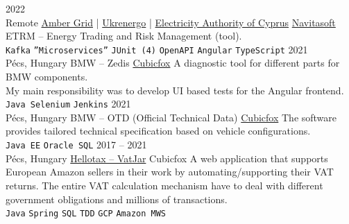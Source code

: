 \documentclass[9pt]{developercv} %
\begin{document}


\begin{entrylist}
    \entry
        {2022 \\ Remote}
        {\href{https://www.ambergrid.lt/en/}{Amber Grid} | \href{https://en.wikipedia.org/wiki/Ukrenergo}{Ukrenergo} | \href{https://en.wikipedia.org/wiki/Electricity_Authority_of_Cyprus}{Electricity Authority of Cyprus}}
        {\href{https://navitasoft.com/en}{Navitasoft}}
        {ETRM -- Energy Trading and Risk Management (tool). \\
            \texttt{Kafka}\slashsep
            \texttt{''Microservices''}\slashsep
            \texttt{JUnit (4)}\slashsep
            \texttt{OpenAPI}\slashsep
            \texttt{Angular}\slashsep
            \texttt{TypeScript}
        }
    \entry
        {2021 \\ Pécs, Hungary}
        {BMW -- Zedis}
        {\href{https://cubicfox.com/}{Cubicfox}}
        {A diagnostic tool for different parts for BMW components.\\
            My main responsibility was to develop UI based tests for the Angular frontend.\\
            \texttt{Java Selenium}\slashsep
            \texttt{Jenkins}
        }
    \entry
        {2021 \\ Pécs, Hungary}
        {BMW -- OTD (Official Technical Data)}
        {\href{https://cubicfox.com/}{Cubicfox}}
        {The software provides tailored technical specification based on vehicle configurations. \\
            \texttt{Java EE}\slashsep
            \texttt{Oracle SQL}
        }
    \entry
        {2017 -- 2021 \\ Pécs, Hungary}
        {\href{https://app.hellotax.com}{Hellotax -- VatJar}}
        {Cubicfox}
        {A web application that supports European Amazon sellers in their work by automating/supporting their VAT returns.
            The entire VAT calculation mechanism have to deal with different government obligations and millions of transactions. \\
            \texttt{Java}\slashsep
            \texttt{Spring}\slashsep
            \texttt{SQL}\slashsep
            \texttt{TDD}\slashsep
            \texttt{GCP}\slashsep
            \texttt{Amazon MWS}\slashsep
}
\end{entrylist}
\end{document}
